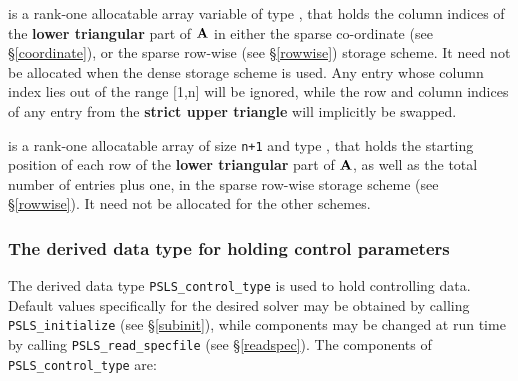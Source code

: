 \documentclass{galahad}
\newcommand{\packagename}{PSLS}
\begin{document}
\begin{description}
 is a rank-one allocatable array variable of type \integer,
that holds the column indices of the {\bf lower triangular} part of
${\mathbf{A}}$ in either the sparse co-ordinate
(see \S\ref{coordinate}), or the sparse row-wise
(see \S\ref{rowwise}) storage scheme.
It need not be allocated when the dense
storage scheme is used.
Any entry whose column index lies out of the range $[$1,n$]$ will be ignored,
while the row and column indices of any entry from the
{\bf strict upper triangle} will implicitly be swapped.

 is a rank-one allocatable array of size {\tt n+1} and type
\integer, that holds the starting position of
each row of the {\bf lower triangular} part of ${\mathbf{A}}$, as well
as the total number of entries plus one, in the sparse row-wise storage
scheme (see \S\ref{rowwise}). It need not be allocated for the
other schemes.

\end{description}


\subsubsection{The derived data type for holding control
 parameters}\label{typecontrol}
The derived data type
{\tt \packagename\_control\_type}
is used to hold controlling data.
Default values specifically for the desired solver
may be obtained by calling
{\tt \packagename\_initialize}
(see \S\ref{subinit}),
while components may be changed at run time by calling
{\tt \packagename\_read\-\_specfile}
(see \S\ref{readspec}).
The components of
{\tt \packagename\_control\_type}
are:
\end{document}
